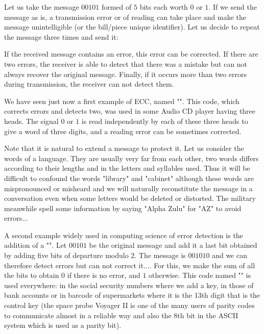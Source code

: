 	Let us take the message $00101$ formed of $5$ bits each worth $0$ or $1$. If we send the message as is, a transmission error or of reading can take place and make the message unintelligible (or the bill/piece unique identifier). Let us decide to repeat the message three times and send it:
	
	If the received message contains an error, this error can be corrected. If there are two errors, the receiver is able to detect that there was a mistake but can not always recover the original message. Finally, if it occurs more than two errors during transmission, the receiver can not detect them.
	
	We have seen just now a first example of ECC, named "". This code, which corrects errors and detects two, was used in some Audio CD player having three heads. The signal $0$ or $1$ is read independently by each of these three heads to give a word of three digits, and a reading error can be sometimes corrected.
	
	Note that it is natural to extend a message to protect it. Let us consider the words of a language. They are usually very far from each other, two words differs according to their lengths and in the letters and syllables used. Thus it will be difficult to confound the words "library" and "cabinet" although these words are mispronounced or misheard and we will naturally reconstitute the message in a conversation even when some letters would be deleted or distorted. The military meanwhile spell some information by saying "Alpha Zulu" for "AZ" to avoid errors...
	
	A second example widely used in computing science of error detection is the addition of a "". Let $00101$ be the original message and add it a last bit obtained by adding five bits of departure modulo $2$. The message is $001010$ and we can therefore detect errors but can not correct it.... For this, we make the sum of all the bits to obtain $0$ if there is no error, and $1$ otherwise. This code named "" is used everywhere: in the social security numbers where we add a key, in those of bank accounts or in barcode of supermarkets where it is the 13th digit that is the control key (the space probe Voyager II is one of the many users of parity codes to communicate almost in a reliable way and also the $8$th bit in the ASCII system which is used as a parity bit).
	
